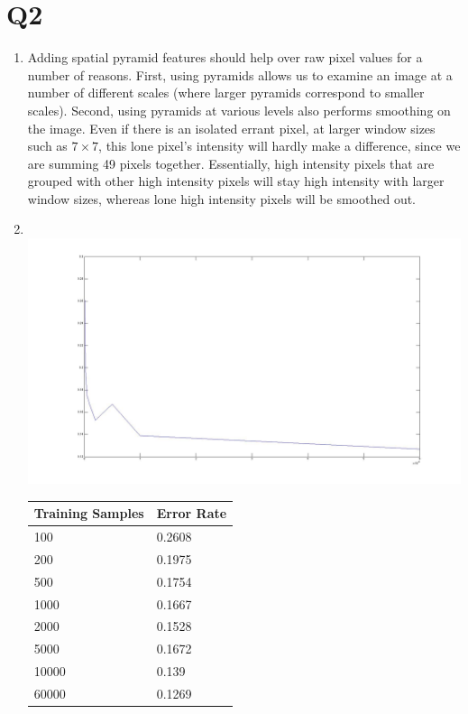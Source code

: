 \documentclass[12pt]{article}
\begin{document}
\section*{Q2}
  \begin{enumerate}[a]
    \item Adding spatial pyramid features should help over raw pixel values for
      a number of reasons. First, using pyramids allows us to examine an image
      at a number of different scales (where larger pyramids correspond to
      smaller scales). Second, using pyramids at various levels also performs
      smoothing on the image. Even if there is an isolated errant pixel, at
      larger window sizes such as $7 \times 7$, this lone pixel's intensity will
      hardly make a difference, since we are summing 49 pixels
      together. Essentially, high intensity pixels that are grouped with other
      high intensity pixels will stay high intensity with larger window sizes,
      whereas lone high intensity pixels will be smoothed out.
    \item \quad \\
      \includegraphics[scale=0.3]{q2_full.jpg}
      \begin{tabular}{l|l}
        \hline
        Training Samples & Error Rate \\
        \hline
        100   & 0.2608 \\
        200   & 0.1975 \\
        500   & 0.1754 \\
        1000  & 0.1667 \\
        2000  & 0.1528 \\
        5000  & 0.1672 \\
        10000 & 0.139 \\
        60000 & 0.1269 \\
      \end{tabular}
  \end{enumerate}
\end{document}
